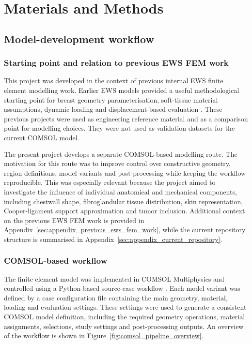 \section{Materials and Methods}




\subsection{Model-development workflow}

\subsubsection{Starting point and relation to previous EWS FEM work}

This project was developed in the context of previous internal EWS finite element modelling work. Earlier EWS models provided a useful methodological starting point for breast geometry parameterisation, soft-tissue material assumptions, dynamic loading and displacement-based evaluation \cite{EngelsEWSReport, StormEWSReport}. These previous projects were used as engineering reference material and as a comparison point for modelling choices. They were not used as validation datasets for the current COMSOL model.

The present project develops a separate COMSOL-based modelling route. The motivation for this route was to improve control over constructive geometry, region definitions, model variants and post-processing while keeping the workflow reproducible. This was especially relevant because the project aimed to investigate the influence of individual anatomical and mechanical components, including chestwall shape, fibroglandular tissue distribution, skin representation, Cooper-ligament support approximation and tumor inclusion. Additional context on the previous EWS FEM work is provided in Appendix~\ref{sec:appendix_previous_ews_fem_work}, while the current repository structure is summarised in Appendix~\ref{sec:appendix_current_repository}.

\subsubsection{COMSOL-based workflow}

The finite element model was implemented in COMSOL Multiphysics and controlled using a Python-based source-case workflow \cite{COMSOLMultiphysicsWebsite}. Each model variant was defined by a case configuration file containing the main geometry, material, loading and evaluation settings. These settings were used to generate a consistent COMSOL model definition, including the required geometry operations, material assignments, selections, study settings and post-processing outputs. An overview of the workflow is shown in Figure~\ref{fig:comsol_pipeline_overview}.

